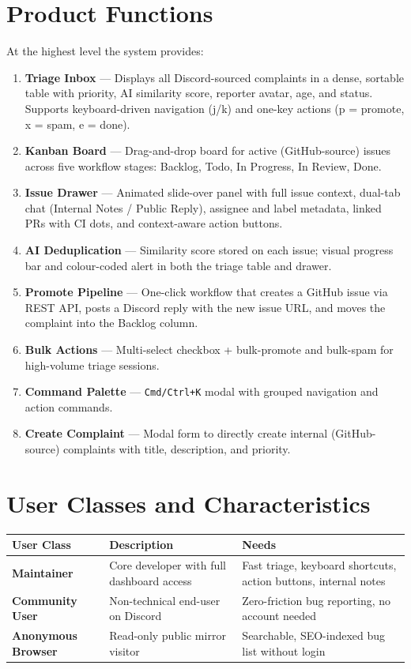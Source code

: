 \documentclass[12pt,a4paper]{report}
\begin{document}
\section{Product Functions}
At the highest level the system provides:
\begin{enumerate}
  \item \textbf{Triage Inbox} --- Displays all Discord-sourced complaints in a
    dense, sortable table with priority, AI similarity score, reporter avatar,
    age, and status.  Supports keyboard-driven navigation (j/k) and one-key
    actions (p = promote, x = spam, e = done).
  \item \textbf{Kanban Board} --- Drag-and-drop board for active (GitHub-source)
    issues across five workflow stages: Backlog, Todo, In Progress, In Review,
    Done.
  \item \textbf{Issue Drawer} --- Animated slide-over panel with full issue
    context, dual-tab chat (Internal Notes / Public Reply), assignee and label
    metadata, linked PRs with CI dots, and context-aware action buttons.
  \item \textbf{AI Deduplication} --- Similarity score stored on each issue;
    visual progress bar and colour-coded alert in both the triage table and
    drawer.
  \item \textbf{Promote Pipeline} --- One-click workflow that creates a GitHub
    issue via REST API, posts a Discord reply with the new issue URL, and moves
    the complaint into the Backlog column.
  \item \textbf{Bulk Actions} --- Multi-select checkbox + bulk-promote and
    bulk-spam for high-volume triage sessions.
  \item \textbf{Command Palette} --- \texttt{Cmd/Ctrl+K} modal with grouped
    navigation and action commands.
  \item \textbf{Create Complaint} --- Modal form to directly create internal
    (GitHub-source) complaints with title, description, and priority.
\end{enumerate}

\section{User Classes and Characteristics}

\begin{longtable}{>{\bfseries}p{3cm} p{4.5cm} p{5.5cm}}
\toprule
User Class & Description & Needs \\
\midrule
\endhead
Maintainer & Core developer with full dashboard access & Fast triage, keyboard shortcuts, action buttons, internal notes \\
Community User & Non-technical end-user on Discord & Zero-friction bug reporting, no account needed \\
Anonymous Browser & Read-only public mirror visitor & Searchable, SEO-indexed bug list without login \\
\bottomrule
\end{longtable}
\end{document}
